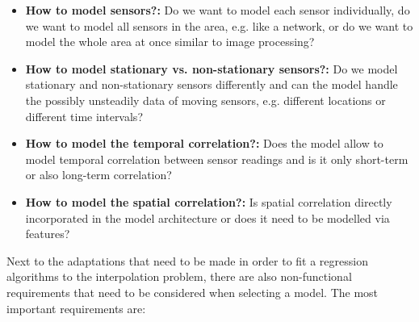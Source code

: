 \begin{itemize}
    \item \textbf{How to model sensors?:} Do we want to model each sensor individually, do we want to model all sensors in the area, e.g. like a network, or do we want to model the whole area at once similar to image processing?
    \item \textbf{How to model stationary vs. non-stationary sensors?:} Do we model stationary and non-stationary sensors differently and can the model handle the possibly unsteadily data of moving sensors, e.g. different locations or different time intervals?
    \item \textbf{How to model the temporal correlation?:} Does the model allow to model temporal correlation between sensor readings and is it only short-term or also long-term correlation?
    \item \textbf{How to model the spatial correlation?:} Is spatial correlation directly incorporated in the model architecture or does it need to be modelled via features?
\end{itemize}

Next to the adaptations that need to be made in order to fit a regression algorithms to the interpolation problem, there are also non-functional requirements that need to be considered when selecting a model. The most important requirements are:

